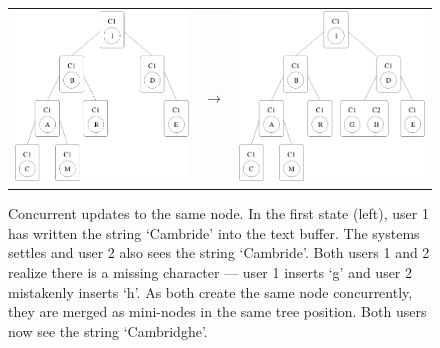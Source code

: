 \documentclass[12pt,a4paper,twoside,openright]{report}
\begin{document}
		\begin{figure}[htb]
		\centering
		  \begin{tabular}{ >{\centering}m{6cm} >{\centering}m{15mm} >{\centering\arraybackslash}m{6cm} }
		    \includegraphics[width=1\linewidth]{figs/treedoc_1.eps}  &
		    $\longrightarrow$  &
		    \includegraphics[width=1\linewidth]{figs/treedoc_2.eps}
		  \end{tabular}
		\caption[Concurrent Updates in Treedoc]{Concurrent updates to the same node. In the first state (left), user 1 has written the string `Cambride' into the text buffer. The systems settles and user 2 also sees the string `Cambride'. Both users 1 and 2 realize there is a missing character --- user 1 inserts `g' and user 2 mistakenly inserts `h'. As both create the same node concurrently, they are merged as mini-nodes in the same tree position. Both users now see the string `Cambridghe'.}
		\label{fig:treedoc}
		\end{figure}
		
\end{document}
